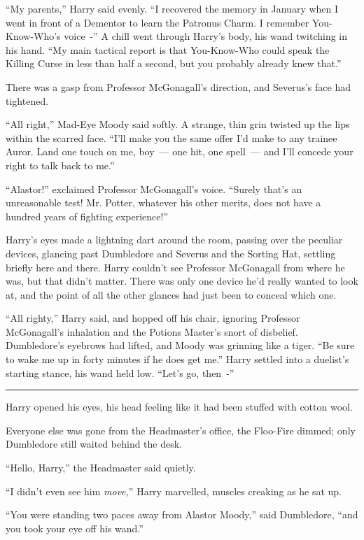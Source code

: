 ``My parents,'' Harry said evenly. ``I recovered the memory in January when I went in front of a Dementor to learn the Patronus Charm. I remember You-Know-Who's voice~-'' A chill went through Harry's body, his wand twitching in his hand. ``My main tactical report is that You-Know-Who could speak the Killing Curse in less than half a second, but you probably already knew that.''

There was a gasp from Professor McGonagall's direction, and Severus's face had tightened.

``All right,'' Mad-Eye Moody said softly. A strange, thin grin twisted up the lips within the scarred face. ``I'll make you the same offer I'd make to any trainee Auror. Land one touch on me, boy~--- one hit, one spell~--- and I'll concede your right to talk back to me.''

``Alastor!'' exclaimed Professor McGonagall's voice. ``Surely that's an unreasonable test! Mr. Potter, whatever his other merits, does not have a hundred years of fighting experience!''

Harry's eyes made a lightning dart around the room, passing over the peculiar devices, glancing past Dumbledore and Severus and the Sorting Hat, settling briefly here and there. Harry couldn't see Professor McGonagall from where he was, but that didn't matter. There was only one device he'd really wanted to look at, and the point of all the other glances had just been to conceal which one.

``All righty,'' Harry said, and hopped off his chair, ignoring Professor McGonagall's inhalation and the Potions Master's snort of disbelief. Dumbledore's eyebrows had lifted, and Moody was grinning like a tiger. ``Be sure to wake me up in forty minutes if he does get me.'' Harry settled into a duelist's starting stance, his wand held low. ``Let's go, then~-''

\begin{center}\rule{3in}{0.4pt}\end{center}

Harry opened his eyes, his head feeling like it had been stuffed with cotton wool.

Everyone else was gone from the Headmaster's office, the Floo-Fire dimmed; only Dumbledore still waited behind the desk.

``Hello, Harry,'' the Headmaster said quietly.

``I didn't even see him \emph{move,}'' Harry marvelled, muscles creaking as he sat up.

``You were standing two paces away from Alastor Moody,'' said Dumbledore, ``and you took your eye off his wand.''

